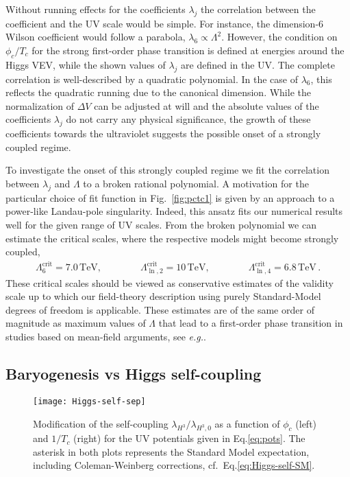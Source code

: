 \documentclass[aps,prd,11pt,tightenlines,superscriptaddress,nofootinbib,preprintnumbers,notitlepage]{revtex4-1}
\newcommand{\qqquad}{\qquad \qquad}
\newcommand{\tev}{\text{TeV}}
\newcommand{\eg}{\textsl{e.g.}\;}
\begin{document}
Without running effects for the coefficients $\lambda_j$ the
correlation between the coefficient and the UV scale would be
simple. For instance, the dimension-6 Wilson coefficient would follow
a parabola, $\lambda_6 \propto \Lambda^2$. However, the condition on
$\phi_c/T_c$ for the strong first-order phase transition is defined at
energies around the Higgs VEV, while the shown values of $\lambda_j$
are defined in the UV.  The complete correlation is well-described by
a quadratic polynomial. In the case of $\lambda_6$, this reflects the
quadratic running due to the canonical dimension.  While the
normalization of $\Delta V$ can be adjusted at will and the absolute
values of the coefficients $\lambda_j$ do not carry any physical
significance, the growth of these coefficients towards the ultraviolet
suggests the possible onset of a strongly coupled regime.

To investigate the onset of this strongly coupled regime we fit the
correlation between $\lambda_j$ and $\Lambda$ to a broken rational
polynomial. A motivation for the particular choice of fit function in
Fig.~\ref{fig:pctc1} is given by an approach to a
power-like Landau-pole singularity. Indeed, this ansatz fits our numerical results well
for the given range of UV scales.  From the broken polynomial we can
estimate the critical scales, where the respective models might become
strongly coupled,
%
\begin{align}
 \Lambda_6^\text{crit} = 7.0\,\tev, \qqquad
 \Lambda_{\ln,2}^\text{crit} = 10 \,\tev, \qqquad
 \Lambda_{\ln,4}^\text{crit} = 6.8 \,\tev \,.
\end{align}
%
These critical scales should be viewed as conservative estimates of
the validity scale up to which our field-theory description using
purely Standard-Model degrees of freedom is applicable.  These
estimates are of the same order of magnitude as maximum values of
$\Lambda$ that lead to a first-order phase transition in studies based
on mean-field arguments, see \eg \cite{christophe_geraldine}.

\subsection{Baryogenesis vs Higgs self-coupling}
\label{sec:baryogenesis}

\begin{figure}[t]
 \texttt{[image: Higgs-self-sep]}
 \caption{Modification of the self-coupling
   $\lambda_{H^3}/\lambda_{H^3,0}$ as a function of $\phi_c$ (left)
   and $1/T_c$ (right) for the UV potentials given in
   Eq.\eqref{eq:pots}.
   The asterisk in both plots represents the 
   Standard Model expectation, including Coleman-Weinberg corrections, 
   cf.~Eq.\eqref{eq:Higgs-self-SM}.}
 \label{fig:Higgs-self-sep}
\end{figure}
\end{document}
